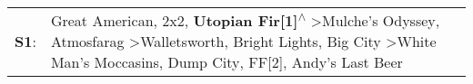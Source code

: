 \begin{supertabular}{p{0.03\textwidth}p{0.92\textwidth}}
 \textbf{S1}:  &  Great American\textsuperscript{}, \enspace 2x2\textsuperscript{}, \enspace \textbf{Utopian Fir[1]\textsuperscript{$\wedge$}} \textgreater \enspace Mulche's Odyssey\textsuperscript{}, \enspace Atmosfarag\textsuperscript{} \textgreater \enspace Walletsworth\textsuperscript{}, \enspace Bright Lights, Big City\textsuperscript{} \textgreater \enspace White Man's Moccasins\textsuperscript{}, \enspace Dump City\textsuperscript{}, \enspace FF[2]\textsuperscript{}, \enspace Andy's Last Beer\textsuperscript{}  \enspace  \\
\end{supertabular}
